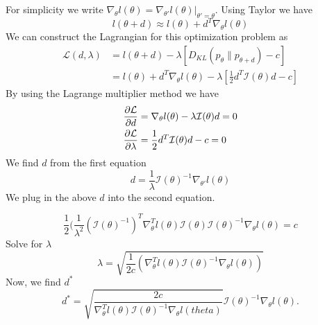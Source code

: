 \begin{answer}
For simplicity we write  $\nabla_{\theta}l(\theta) =\nabla_{\theta'}l(\theta)|_{\theta' = \theta}. $
Using Taylor we have
$$
l(\theta+ d) \approx l(\theta) + d^T\nabla_{\theta}l(\theta)
$$
We can construct the Lagrangian for this optimization problem as
$$
\begin{aligned}
\mathcal L(d, \lambda) &= l(\theta+d)  - \lambda[D_{KL}(p_{\theta}\|p_{\theta + d}) - c]\\
&= l(\theta) + d^T\nabla_{\theta}l(\theta) - \lambda[\frac{1}{2}d^T\mathcal I(\theta)d - c]
\end{aligned}
$$
By using the Lagrange multiplier method we have
$$
\begin{aligned}
\frac{\partial \cal L}{\partial d} &=  \nabla_{\theta}l(\theta) - \lambda \mathcal I(\theta)d = 0\\
\frac{\partial \cal L}{\partial \lambda} &= \frac{1}{2}d^T\mathcal I(\theta) d - c = 0
\end{aligned}
$$
We find $d$ from the first equation
$$
d = \frac{1}{\lambda}\mathcal I(\theta)^{-1}\nabla_{\theta'}l(\theta)
$$
We plug in the above $d$ into the second equation.


$$
\frac{1}{2}(\frac{1}{\lambda^2}(\mathcal I(\theta)^{-1})^T\nabla^T_{\theta}l(\theta)\mathcal I(\theta)\mathcal I(\theta)^{-1}\nabla_{\theta}l(\theta) = c
$$
Solve for $\lambda$
$$
\lambda = \sqrt{\frac{1}{2c}(\nabla^T_{\theta}l(\theta)\mathcal I(\theta)^{-1} \nabla_{\theta}l(\theta))}
$$
Now, we find $d^{*}$
$$
d^{*} =\sqrt{\frac{2c}{\nabla^T_{\theta}l(\theta)\mathcal I(\theta)^{-1} \nabla_{\theta}l(theta)}}\mathcal I(\theta)^{-1}\nabla_{\theta}l(\theta).
$$


 \end{answer}

